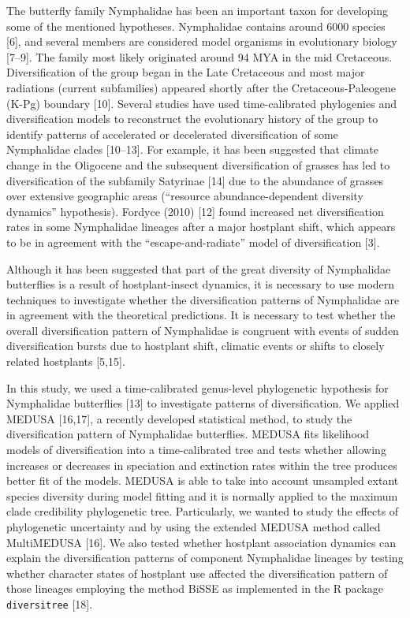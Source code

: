 \documentclass[10pt]{article}
\begin{document}
The butterfly family Nymphalidae has been an important taxon for
developing some of the mentioned hypotheses. Nymphalidae contains around
6000 species {[}6{]}, and several members are considered model organisms
in evolutionary biology {[}7--9{]}. The family most likely originated
around 94 MYA in the mid Cretaceous. Diversification of the group began
in the Late Cretaceous and most major radiations (current subfamilies)
appeared shortly after the Cretaceous-Paleogene (K-Pg) boundary
{[}10{]}. Several studies have used time-calibrated phylogenies and
diversification models to reconstruct the evolutionary history of the
group to identify patterns of accelerated or decelerated diversification
of some Nymphalidae clades {[}10--13{]}. For example, it has been
suggested that climate change in the Oligocene and the subsequent
diversification of grasses has led to diversification of the subfamily
Satyrinae {[}14{]} due to the abundance of grasses over extensive
geographic areas (``resource abundance-dependent diversity dynamics''
hypothesis). Fordyce (2010) {[}12{]} found increased net diversification
rates in some Nymphalidae lineages after a major hostplant shift, which
appears to be in agreement with the ``escape-and-radiate'' model of
diversification {[}3{]}.

Although it has been suggested that part of the great diversity of
Nymphalidae butterflies is a result of hostplant-insect dynamics, it is
necessary to use modern techniques to investigate whether the
diversification patterns of Nymphalidae are in agreement with the
theoretical predictions. It is necessary to test whether the overall
diversification pattern of Nymphalidae is congruent with events of
sudden diversification bursts due to hostplant shift, climatic events or
shifts to closely related hostplants {[}5,15{]}.

In this study, we used a time-calibrated genus-level phylogenetic
hypothesis for Nymphalidae butterflies {[}13{]} to investigate patterns
of diversification. We applied MEDUSA {[}16,17{]}, a recently developed
statistical method, to study the diversification pattern of Nymphalidae
butterflies. MEDUSA fits likelihood models of diversification into a
time-calibrated tree and tests whether allowing increases or decreases
in speciation and extinction rates within the tree produces better fit
of the models. MEDUSA is able to take into account unsampled extant
species diversity during model fitting and it is normally applied to the
maximum clade credibility phylogenetic tree. Particularly, we wanted to
study the effects of phylogenetic uncertainty and by using the extended
MEDUSA method called MultiMEDUSA {[}16{]}. We also tested whether
hostplant association dynamics can explain the diversification patterns
of component Nymphalidae lineages by testing whether character states of
hostplant use affected the diversification pattern of those lineages
employing the method BiSSE as implemented in the R package
\texttt{diversitree} {[}18{]}.
\end{document}
